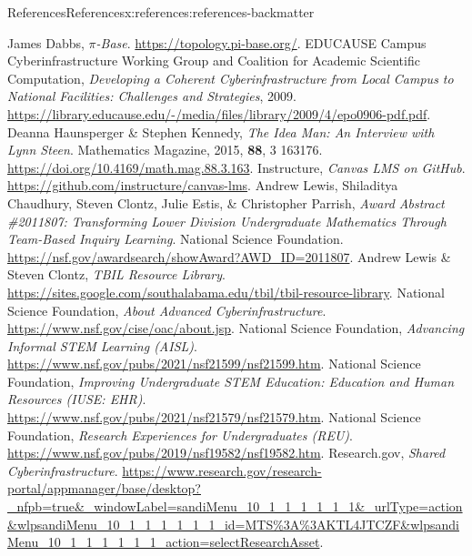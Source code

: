 \documentclass[oneside,10pt,]{article}
\begin{document}
\begin{references-section-numberless}{References}{}{References}{}{}{x:references:references-backmatter}
\begin{referencelist}
\hypertarget{x:biblio:biblio-pibase}{}James Dabbs, \textit{\(\pi\)-Base}. \url{https://topology.pi-base.org/}.
\hypertarget{x:biblio:biblio-cyber-educause}{}EDUCAUSE Campus Cyberinfrastructure Working Group and Coalition for Academic Scientific Computation, \textit{Developing a Coherent Cyberinfrastructure from Local Campus to National Facilities: Challenges and Strategies}, 2009. \url{https://library.educause.edu/-/media/files/library/2009/4/epo0906-pdf.pdf}.
\hypertarget{x:biblio:biblio-steen}{}Deanna Haunsperger \& Stephen Kennedy, \textit{The Idea Man: An Interview with Lynn Steen}. Mathematics Magazine, 2015, \textbf{88}, 3 163\textendash{}176. \url{https://doi.org/10.4169/math.mag.88.3.163}.
\hypertarget{x:biblio:biblio-canvas}{}Instructure, \textit{Canvas LMS on GitHub}. \url{https://github.com/instructure/canvas-lms}.
\hypertarget{x:biblio:biblio-tbil-award}{}Andrew Lewis, Shiladitya Chaudhury, Steven Clontz, Julie Estis, \& Christopher Parrish, \textit{Award Abstract \#2011807: Transforming Lower Division Undergraduate Mathematics Through Team-Based Inquiry Learning}. National Science Foundation. \url{https://nsf.gov/awardsearch/showAward?AWD_ID=2011807}.
\hypertarget{x:biblio:biblio-tbil-library}{}Andrew Lewis \& Steven Clontz, \textit{TBIL Resource Library}. \url{https://sites.google.com/southalabama.edu/tbil/tbil-resource-library}.
\hypertarget{x:biblio:biblio-cyber-nsf}{}National Science Foundation, \textit{About Advanced Cyberinfrastructure}. \url{https://www.nsf.gov/cise/oac/about.jsp}.
\hypertarget{x:biblio:biblio-aisl}{}National Science Foundation, \textit{Advancing Informal STEM Learning (AISL)}. \url{https://www.nsf.gov/pubs/2021/nsf21599/nsf21599.htm}.
\hypertarget{x:biblio:biblio-iuse}{}National Science Foundation, \textit{Improving Undergraduate STEM Education: Education and Human Resources (IUSE: EHR)}. \url{https://www.nsf.gov/pubs/2021/nsf21579/nsf21579.htm}.
\hypertarget{x:biblio:biblio-reu}{}National Science Foundation, \textit{Research Experiences for Undergraduates (REU)}. \url{https://www.nsf.gov/pubs/2019/nsf19582/nsf19582.htm}.
\hypertarget{x:biblio:biblio-cyber-researchgov}{}Research.gov, \textit{Shared Cyberinfrastructure}. \url{https://www.research.gov/research-portal/appmanager/base/desktop?_nfpb=true\&_windowLabel=sandiMenu_10_1_1_1_1_1_1\&_urlType=action\&wlpsandiMenu_10_1_1_1_1_1_1_id=MTS\%3A\%3AKTL4JTCZF\&wlpsandiMenu_10_1_1_1_1_1_1_action=selectResearchAsset}.

\end{referencelist}
\end{references-section-numberless}
\end{document}

